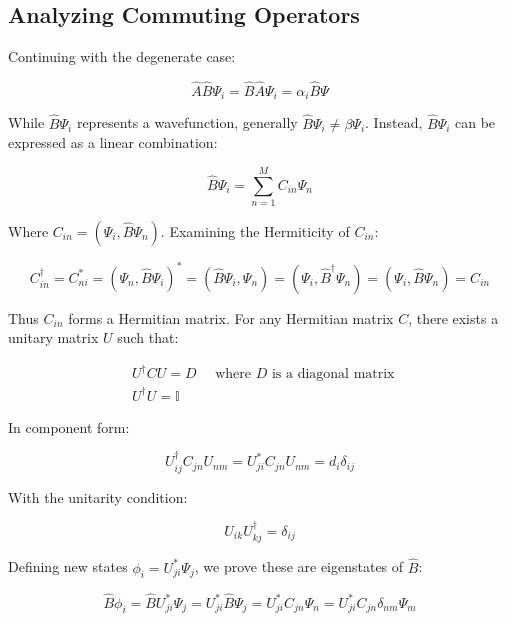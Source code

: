 \documentclass[italian]{HKNdocument}
\begin{document}
\subsection{Analyzing Commuting Operators}
Continuing with the degenerate case:

\begin{equation}
\hat{A} \hat{B} \Psi_{i}=\hat{B} \hat{A} \Psi_{i}=\alpha_{i} \hat{B} \Psi
\end{equation}

While $\hat{B} \Psi_{i}$ represents a wavefunction, generally $\hat{B} \Psi_{i} \neq \beta \Psi_{i}$. Instead, $\hat{B} \Psi_{i}$ can be expressed as a linear combination:

\begin{equation}
\hat{B} \Psi_{i}=\sum_{n=1}^{M} C_{i n} \Psi_{n}
\end{equation}

Where $C_{i n}=\left(\Psi_{i}, \hat{B} \Psi_{n}\right)$. Examining the Hermiticity of $C_{in}$:

\begin{equation}
C_{i n}^{\dagger}=C_{n i}^{*}=\left(\Psi_{n}, \hat{B} \Psi_{i}\right)^{*}=\left(\hat{B} \Psi_{i}, \Psi_{n}\right)=\left(\Psi_{i}, \hat{B}^{\dagger} \Psi_{n}\right)=\left(\Psi_{i}, \hat{B} \Psi_{n}\right)=C_{i n}
\end{equation}

Thus $C_{i n}$ forms a Hermitian matrix. For any Hermitian matrix $C$, there exists a unitary matrix $U$ such that:

\begin{align}
& U^{\dagger} C U=D \quad \text { where } D \text { is a diagonal matrix } \\
& U^{\dagger} U=\mathbb{I}
\end{align}

In component form:

\begin{equation}
U_{i j}^{\dagger} C_{j n} U_{n m}=U_{j i}^{*} C_{j n} U_{n m}=d_{i} \delta_{i j}
\end{equation}

With the unitarity condition:

\begin{equation}
U_{i k} U_{k j}^{\dagger}=\delta_{i j}
\end{equation}

Defining new states $\phi_{i}=U_{j i}^{*} \Psi_{j}$, we prove these are eigenstates of $\hat{B}$:

\begin{equation}
\hat{B} \phi_{i}=\hat{B} U_{j i}^{*} \Psi_{j}=U_{j i}^{*} \hat{B} \Psi_{j}=U_{j i}^{*} C_{j n} \Psi_{n}=U_{j i}^{*} C_{j n} \delta_{n m} \Psi_{m}
\end{equation}
\end{document}
